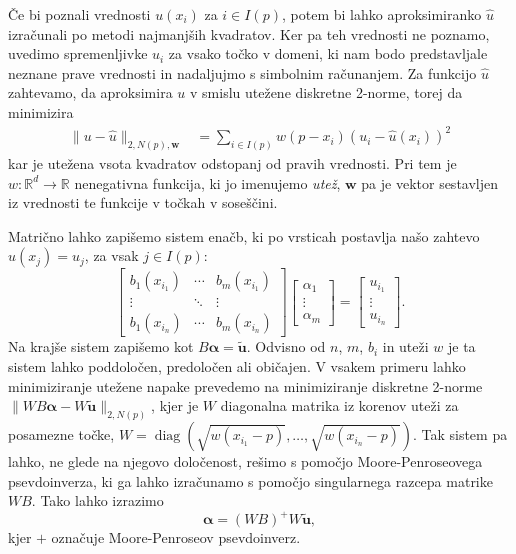 \documentclass[a4paper,twoside]{article}
\theoremstyle{definition} %
\theoremstyle{plain} %
\numberwithin{equation}{section}
\newcommand{\R}{\mathbb R}
\renewcommand{\b}{\boldsymbol}
\newcommand{\uh}{\hat{u}}
\DeclareMathOperator{\diag}{diag}
\begin{document}
Če bi poznali vrednosti $u(x_i)$ za $i \in I(p)$, potem bi lahko aproksimiranko
$\uh$ izračunali po metodi najmanjših kvadratov. Ker pa teh vrednosti ne
poznamo, uvedimo spremenljivke $u_i$ za vsako točko v domeni, ki nam bodo
predstavljale neznane prave vrednosti in nadaljujmo
s simbolnim računanjem. Za funkcijo $\uh$ zahtevamo, da aproksimira $u$ v smislu
utežene diskretne 2-norme, torej da minimizira
\begin{align*}
  \|u-\uh\|_{2,N(p),\b{w}} &= \sum_{i\in I(p)} w(p-x_i) (u_i - \uh(x_i))^2
\end{align*}
kar je utežena vsota kvadratov odstopanj od pravih vrednosti. Pri tem je
$w\colon\R^d\to\R$ nenegativna funkcija, ki jo imenujemo \emph{utež}, $\b{w}$ pa
je vektor sestavljen iz vrednosti te funkcije v točkah v soseščini.

Matrično lahko zapišemo sistem enačb, ki po vrsticah
postavlja našo zahtevo $\hat{u}(x_j) = u_j$, za vsak $j \in I(p)$:
\begin{equation}
\begin{bmatrix}
  b_1(x_{i_1}) & \cdots & b_m(x_{i_1}) \\
  \vdots & \ddots & \vdots   \\
  b_1(x_{i_n}) & \cdots & b_m(x_{i_n})
\end{bmatrix}
\begin{bmatrix}
  \alpha_1 \\ \vdots \\ \alpha_m
\end{bmatrix}
=
\begin{bmatrix}
  u_{i_1} \\ \vdots \\ u_{i_n}
\end{bmatrix}.
  \label{eq:shape-system}
\end{equation}
Na krajše sistem zapišemo kot $B\b{\alpha} = \b{\tilde{u}}$. Odvisno od
$n$, $m$, $b_i$ in uteži $w$ je ta sistem lahko poddoločen, predoločen ali
običajen. V vsakem primeru lahko minimiziranje utežene napake prevedemo na
minimiziranje diskretne 2-norme $\|WB\b{\alpha}-W\b{\tilde{u}}\|_{2,N(p)}$, kjer je $W$
diagonalna matrika iz korenov uteži za posamezne točke, $W =
\diag(\sqrt{w(x_{i_1}-p)}, \dots, \sqrt{w(x_{i_n}-p)})$. Tak sistem pa lahko, ne
glede na njegovo določenost, rešimo s pomočjo Moore-Penroseovega
psevdoinverza, ki ga lahko izračunamo s pomočjo singularnega razcepa matrike
$WB$.
Tako lahko izrazimo \[ \b{\alpha} = (WB)^{+}W\b{\tilde u}, \]
kjer $+$ označuje Moore-Penroseov psevdoinverz.
\end{document}
